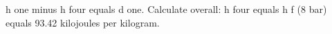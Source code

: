 h one minus h four equals d one.  
Calculate overall:  
h four equals h f (8 bar) equals 93.42 kilojoules per kilogram.
